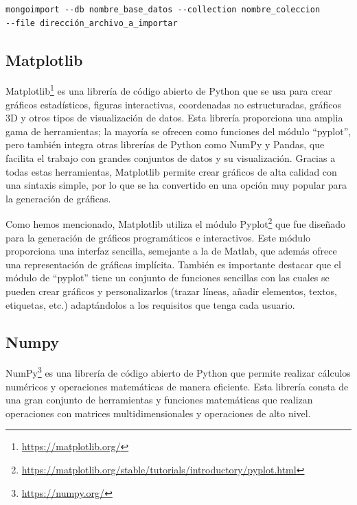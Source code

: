 \documentclass[a4paper, 12pt]{book}
\begin{document}
\begin{verbatim}
mongoimport --db nombre_base_datos --collection nombre_coleccion
--file dirección_archivo_a_importar
\end{verbatim}

\subsection{Matplotlib} %
\label{sec:matplotlib} %

Matplotlib\footnote{\url{https://matplotlib.org/}} es una librería de código abierto de Python que se usa para crear gráficos estadísticos, figuras interactivas, coordenadas no estructuradas, gráficos 3D y otros tipos de visualización de datos.
Esta librería proporciona una amplia gama de herramientas; la mayoría se ofrecen como funciones del módulo ``pyplot'', pero también integra otras librerías de Python como NumPy y Pandas, que facilita el trabajo con grandes conjuntos de datos y su visualización.
Gracias a todas estas herramientas, Matplotlib permite crear gráficos de alta calidad con una sintaxis simple, por lo que se ha convertido en una opción muy popular para la generación de gráficas.


Como hemos mencionado, Matplotlib utiliza el módulo Pyplot\footnote{\url{https://matplotlib.org/stable/tutorials/introductory/pyplot.html}} que fue diseñado para la generación de gráficos programáticos e interactivos.
Este módulo proporciona una interfaz sencilla, semejante a la de Matlab, que además ofrece una representación de gráficas implícita.
También es importante destacar que el módulo de ``pyplot'' tiene un conjunto de funciones sencillas con las cuales se pueden crear gráficos y personalizarlos (trazar líneas, añadir elementos, textos, etiquetas, etc.) adaptándolos a los requisitos que tenga cada usuario. 

 
\subsection{Numpy} %
\label{sec:numpy} %

NumPy\footnote{\url{https://numpy.org/}} es una librería de código abierto de Python que permite realizar cálculos numéricos y operaciones matemáticas de manera eficiente.
Esta librería consta de una gran conjunto de herramientas y funciones matemáticas que realizan operaciones con matrices multidimensionales y operaciones de alto nivel.  
\end{document}
